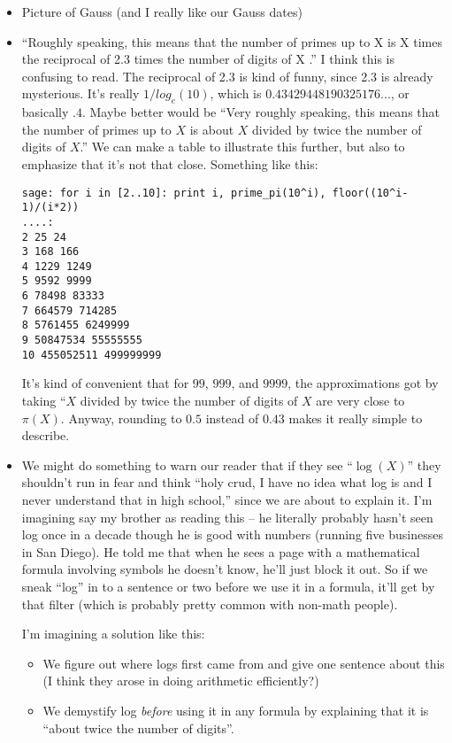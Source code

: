 \documentclass{article}
\begin{document}
\begin{itemize}
\item Picture of Gauss  (and I really like our Gauss dates)

\item ``Roughly speaking, this means that the number of primes up to X
  is X times the reciprocal of 2.3 times the number of digits of X .''
  I think this is confusing to read.  The reciprocal of 2.3 is kind of
  funny, since 2.3 is already mysterious.  It's really $1/log_e(10)$,
  which is $0.43429448190325176...$, or basically $.4$.  Maybe better
  would be ``Very roughly speaking, this means that the number of
  primes up to $X$ is about $X$ divided by twice the number of digits
  of $X$.''  We can make a
  table to illustrate this further, but also to emphasize that it's
  not that close. Something like this:
\begin{verbatim}
sage: for i in [2..10]: print i, prime_pi(10^i), floor((10^i-1)/(i*2))
....: 
2 25 24
3 168 166
4 1229 1249
5 9592 9999
6 78498 83333
7 664579 714285
8 5761455 6249999
9 50847534 55555555
10 455052511 499999999
\end{verbatim}

  It's kind of convenient that for $99$, $999$, and $9999$, the
  approximations got by taking ``$X$ divided by twice the number of
  digits of $X$ are very close to $\pi(X)$.  Anyway, rounding to $0.5$
  instead of $0.43$ makes it really simple to describe.

\item We might do something to warn our reader that if they see
  ``$\log(X)$'' they shouldn't run in fear and think ``holy crud, I
  have no idea what log is and I never understand that in high
  school,'' since we are about to explain it.  I'm imagining say my
  brother as reading this -- he literally probably hasn't seen log
  once in a decade though he is good with numbers (running five
  businesses in San Diego).  He told me that when he sees a page with
  a mathematical formula involving symbols he doesn't know, he'll just
  block it out.  So if we sneak ``log'' in to a sentence or two before
  we use it in a formula, it'll get by that filter (which is probably
  pretty common with non-math people).   

I'm imagining a solution like this:
\begin{itemize}
\item We figure out where logs first came from and give one sentence about
this (I think they arose in doing arithmetic efficiently?)  

\item We demystify log {\em before} using it in any formula by explaining
that it is ``about twice the number of digits''. 


\end{itemize}
\end{itemize}
\end{document}
